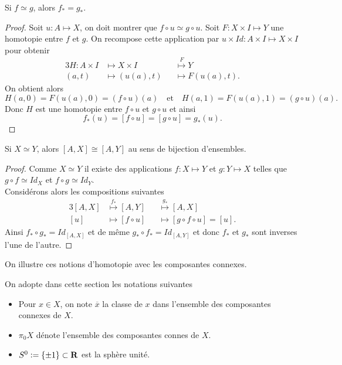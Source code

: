 \documentclass[main.tex]{subfiles}
\begin{document}
	\begin{lemma}
		Si $f \simeq g$, alors $f_{*} = g_{*}$.	
	\end{lemma}
	\begin{proof}
		Soit $u : A \longmapsto X$, on doit montrer que $f\circ u \simeq g\circ u$.
		Soit $F : X \times I \longmapsto Y$ une homotopie entre $f$ et $g$. On recompose cette application par $u \times Id : A \times I \longmapsto X \times I$ pour obtenir
		\begin{alignat*}{3}
			H : A \times I &\longmapsto X \times I &&\overset{F}{\longmapsto} Y \\
			(a,t) &\longmapsto (u(a),t) &&\longmapsto F(u(a),t)
		.\end{alignat*}
		On obtient alors \[
			H(a,0) = F(u(a),0) = (f\circ u)(a) \quad \text{et} \quad H(a,1) = F(u(a),1) = (g\circ u)(a)
		.\] Donc $H$ est une homotopie entre $f\circ u$ et $g\circ u$ et ainsi
		\[
			f_{*}(u) = [f\circ u] = [g\circ u] = g_{*}(u)
		.\] 
	\end{proof}

	\begin{prop}
		Si $X \simeq Y$, alors $[A,X] \cong [A,Y]$ au sens de bijection d'ensembles.
	\end{prop}

	\begin{proof}
		Comme $X \simeq Y$ il existe des applications $f : X \longmapsto Y$ et $g : Y \longmapsto X$ telles que $g\circ f \simeq Id_X$ et $f\circ g \simeq Id_Y$. \\
		Considérons alors les compositions suivantes
		\begin{alignat*}{3}
			[A,X] &\overset{f_{*}}{\longmapsto} [A,Y] &&\overset{g_{*}}{\longmapsto} [A,X] \\
			[u] &\longmapsto [f\circ u] &&\longmapsto [g\circ f\circ u] = [u]
		.\end{alignat*}
		Ainsi $f_{*}\circ g_{*} = Id_{[A,X]}$ et de même $g_{*}\circ f_{*} = Id_{[A,Y]}$ et donc $f_{*}$ et $g_{*}$ sont inverses l'une de l'autre.
	\end{proof}
	
	On illustre ces notions d'homotopie avec les composantes connexes.
	\begin{notation}
		On adopte dans cette section les notations suivantes \\
		\renewcommand\labelitemi{$\bullet$}
		\begin{itemize}
		\item Pour $x \in X$, on note $\overline{x}$ la classe de $x$ dans l'ensemble des composantes connexes de $X$.

		\item $\pi_{0} X$ dénote l'ensemble des composantes connes de $X$.

		\item $S^{0} \vcentcolon= \{\pm 1\} \subset \mathbf{R}$ est la sphère unité.
		\end{itemize}
	\end{notation}
\end{document}
